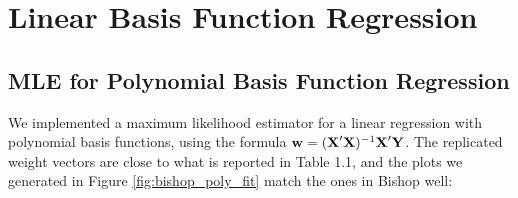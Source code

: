 
\section{Linear Basis Function Regression}\label{sec:lin_basis_fn_reg}

\subsection{MLE for Polynomial Basis Function Regression}
We implemented a maximum likelihood estimator for a linear regression with polynomial basis functions, using the formula $\boldsymbol{\mathbf{w}} = (\boldsymbol{\mathbf{X}}'\boldsymbol{\mathbf{X}})^{-1} \boldsymbol{\mathbf{X}}'\boldsymbol{\mathbf{Y}}$. The replicated weight vectors are close to what is reported in Table 1.1, and the plots we generated in Figure \ref{fig:bishop_poly_fit} match the ones in Bishop well:

